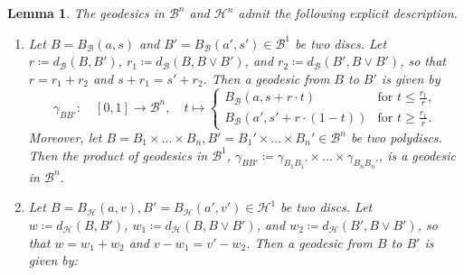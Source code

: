 \documentclass[10pt]{article}
\newtheorem{lemma}[theorem]{Lemma}
\theoremstyle{definition}
\begin{document}
\begin{lemma}
  \label{lem:geodesics}
  The geodesics in $\mathcal{B}^n$ and $\mathcal{H}^n$ admit the following explicit description.
  \begin{enumerate}
  \item[(i)] \label{enumitem:geodesic1} Let $B=B_{\mathcal{B}}(a,s)$ and $B'=B_{\mathcal{B}}(a',s') \in\mathcal B^1$ be two discs.  Let $r\coloneqq d_{\mathcal{B}}(B,B')$, $r_1\coloneqq d_{\mathcal{B}}(B,B\vee B')$, and $r_2\coloneqq d_{\mathcal{B}}(B',B\vee B')$, so that $r=r_1+r_2$ and $s+r_1=s'+r_2$.  Then a geodesic from $B$ to $B'$ is given by
  \begin{equation*}
    \gamma_{BB'}\colon\quad [0,1]\rightarrow \mathcal B^n,\quad t\mapsto
    \begin{cases}
        B_{\mathcal{B}}(a, s + r\cdot t)&\text{for }t\leq \frac{r_1}{r},\\
        B_{\mathcal{B}}(a', s'+ r\cdot (1-t))&\text{for }t\geq \frac{r_1}{r}.
    \end{cases}
  \end{equation*}
  Moreover, let $B=B_1\times\dots\times B_n, B'=B_1'\times\dots\times B_n' \in\mathcal B^n$ be two polydiscs.
  Then the product of geodesics in $\mathcal B^1$, 
  $\gamma_{BB'}\coloneqq \gamma_{B_1B_1'}\times\dots\times\gamma_{B_nB_n'}$, is a geodesic in $\mathcal B^n$.
  \item[(ii)] \label{enumitem:geodesic2} Let $B=B_{\mathcal{H}}(a,v), B'=B_{\mathcal{H}}(a',v') \in\mathcal H^1$ be two discs.  Let $w\coloneqq d_{\mathcal{H}}(B,B')$, $w_1\coloneqq d_{\mathcal{H}}(B,B\vee B')$, and $w_2\coloneqq d_{\mathcal{H}}(B',B\vee B')$, so that $w=w_1+w_2$ and $v-w_1=v'-w_2$.  Then a geodesic from $B$ to $B'$ is given by:

\end{enumerate}
\end{lemma}
\end{document}
